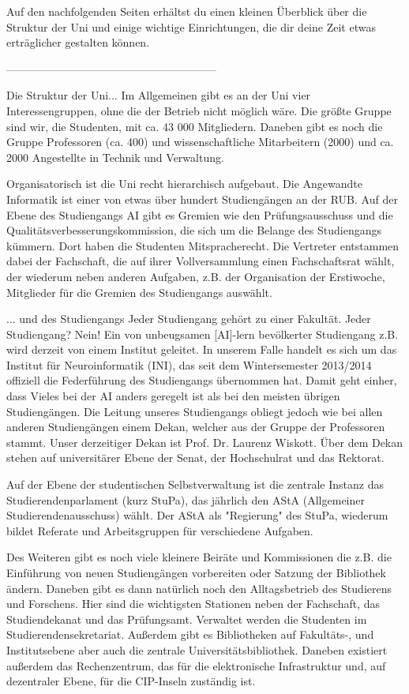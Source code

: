 Auf den nachfolgenden Seiten erhältst du einen kleinen Überblick über die Struktur der Uni und einige wichtige Einrichtungen, die dir deine Zeit etwas erträglicher gestalten können.

---------------------------------------------------------

Die Struktur der Uni...
Im Allgemeinen gibt es an der Uni vier Interessengruppen, ohne die der Betrieb nicht möglich wäre. Die größte Gruppe sind wir, die Studenten, mit ca. 43 000 Mitgliedern. Daneben gibt es noch die Gruppe Professoren (ca. 400) und wissenschaftliche Mitarbeitern (2000) und ca. 2000 Angestellte in Technik und Verwaltung.

Organisatorisch ist die Uni recht hierarchisch aufgebaut. Die Angewandte Informatik ist einer von etwas über hundert Studiengängen an der RUB. Auf der Ebene des Studiengangs AI gibt es Gremien wie den Prüfungsausschuss und die Qualitätsverbesserungskommission, die sich um die Belange des Studiengangs kümmern. Dort haben die Studenten Mitspracherecht. Die Vertreter entstammen dabei der Fachschaft, die auf ihrer Vollversammlung einen Fachschaftsrat wählt,  der wiederum neben anderen Aufgaben, z.B. der Organisation der Erstiwoche, Mitglieder für die Gremien des Studiengangs auswählt.

... und des Studiengangs
Jeder Studiengang gehört zu einer Fakultät. Jeder Studiengang? Nein! Ein von unbeugsamen [AI]-lern bevölkerter Studiengang z.B. wird derzeit von einem Institut geleitet. In unserem Falle handelt es sich um das Institut für Neuroinformatik (INI), das seit dem Wintersemester 2013/2014 offiziell die Federführung des Studiengangs übernommen hat. Damit geht einher, dass Vieles bei der AI anders geregelt ist als bei den meisten übrigen Studiengängen. Die Leitung unseres Studiengangs obliegt jedoch wie bei allen anderen Studiengängen einem Dekan, welcher aus der Gruppe der Professoren stammt. Unser derzeitiger Dekan ist Prof. Dr. Laurenz Wiskott. Über dem Dekan stehen auf universitärer Ebene der Senat, der Hochschulrat und das Rektorat.

Auf der Ebene der studentischen Selbstverwaltung ist die zentrale Instanz das Studierendenparlament (kurz StuPa), das jährlich den AStA (Allgemeiner Studierendenausschuss) wählt. Der AStA als "Regierung" des StuPa, wiederum bildet Referate und Arbeitsgruppen für verschiedene Aufgaben.

Des Weiteren gibt es noch viele kleinere Beiräte und Kommissionen die z.B. die Einführung von neuen Studiengängen vorbereiten oder Satzung der Bibliothek ändern. Daneben gibt es dann natürlich noch den Alltagsbetrieb des Studierens und Forschens. Hier sind die wichtigsten Stationen neben der Fachschaft, das Studiendekanat und das Prüfungsamt. Verwaltet werden die Studenten im Studierendensekretariat. Außerdem gibt es Bibliotheken auf Fakultäts-, und Institutsebene aber auch die zentrale Universitätsbibliothek. Daneben existiert außerdem das Rechenzentrum, das für die elektronische Infrastruktur und, auf dezentraler Ebene, für die CIP-Inseln zuständig ist.

